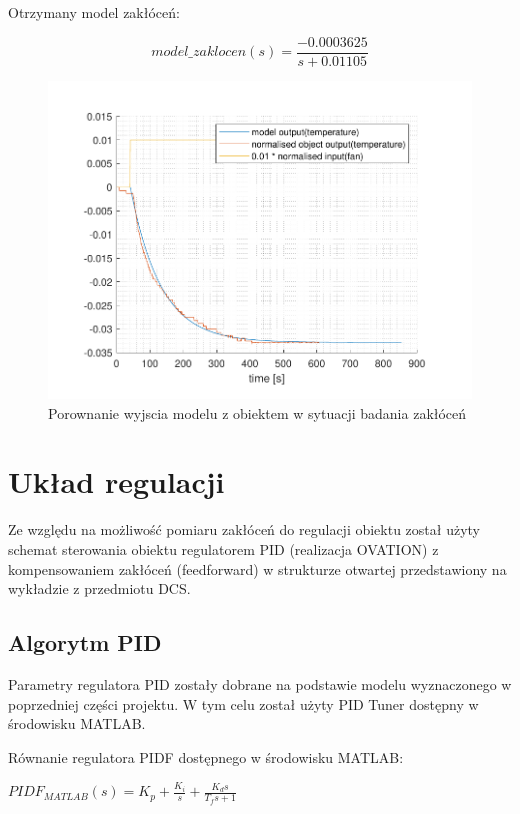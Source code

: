 \documentclass{mwrep}
\begin{document}
Otrzymany model zakłóceń:

\[model\_zaklocen(s) = \frac{-0.0003625}{s + 0.01105}\]

\begin{figure}[H]
\centering
\includegraphics[scale=0.8]{materialy/krystian_plots/wykresik_zaklocenia.pdf}
\caption{Porownanie wyjscia modelu z obiektem w sytuacji badania zakłóceń}
\end{figure}


\chapter{Układ regulacji}
\label{UkladRegulacji}

Ze względu na możliwość pomiaru zakłóceń do regulacji obiektu został użyty schemat sterowania obiektu regulatorem PID (realizacja OVATION) z kompensowaniem zakłóceń (feedforward) w strukturze otwartej przedstawiony na wykładzie z przedmiotu DCS.

\section{Algorytm PID}
\label{PID}

Parametry regulatora PID zostały dobrane na podstawie modelu wyznaczonego w poprzedniej części projektu. W tym celu został użyty PID Tuner dostępny w środowisku MATLAB.

Równanie regulatora PIDF dostępnego w środowisku MATLAB:

\vspace{2mm}
$PIDF_{MATLAB}(s) = K _ { p } + \frac { K _ { i } } { s } + \frac { K _ { d } s } { T _ { f } s + 1 }$
\vspace{3mm}
\end{document}
